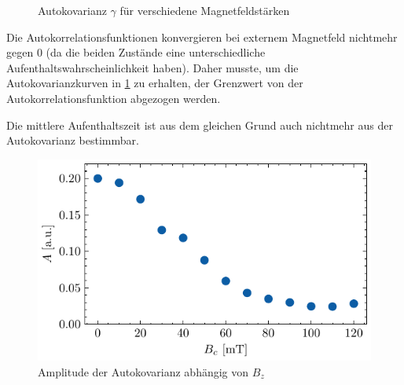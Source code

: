 \documentclass[main.tex]{subfiles}
\begin{document}
\begin{figure}[H]
    \caption{Autokovarianz $\gamma$ für verschiedene Magnetfeldstärken }\label{fig:bc-autocov}
\end{figure}


Die Autokorrelationsfunktionen konvergieren bei externem Magnetfeld nichtmehr gegen \num{0} (da die beiden Zustände eine unterschiedliche Aufenthaltswahrscheinlichkeit haben). Daher musste, um die Autokovarianzkurven in \cref{fig:bc-autocov} zu erhalten, der Grenzwert von der Autokorrelationsfunktion abgezogen werden.

Die mittlere Aufenthaltszeit ist aus dem gleichen Grund auch nichtmehr aus der Autokovarianz bestimmbar. 





\begin{figure}[H]
    \centering
    \includegraphics{bilder/plots/max_Bz/rauschamplitude.pdf}
    \caption{Amplitude der Autokovarianz abhängig von \(B_z\)}\label{fig:bc-rauschampl}
\end{figure}
\end{document}
